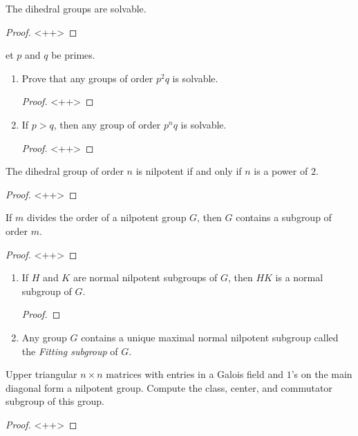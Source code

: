 \documentclass[12pt]{article}
\theoremstyle{definition}
\newenvironment{problem}[2][Problem]{\begin{trivlist}
\item[\hskip \labelsep {\bfseries #1}\hskip \labelsep {\bfseries #2.}]}{\end{trivlist}}
\begin{document}
\begin{problem}{12}
	The dihedral groups are solvable.
	\begin{proof}
		<++>
	\end{proof}
\end{problem}
\begin{problem}
	Let $p$ and $q$ be primes.
	\begin{enumerate}[label=(\alph*)]
		\item Prove that any groups of order $p^2q$ is solvable.
			\begin{proof}
				<++>
			\end{proof}
		\item If $p > q$, then any group of order $p^n q$ is solvable.
			\begin{proof}
				<++>
			\end{proof}
	\end{enumerate}
\end{problem}
\begin{problem}{14}
	The dihedral group of order $n$ is nilpotent if and only if $n$ is a power of $2$.
	\begin{proof}
		<++>
	\end{proof}
\end{problem}
\begin{problem}{15}
	If $m$ divides the order of a nilpotent group $G$, then $G$ contains a subgroup of order $m$.
	\begin{proof}
		<++>
	\end{proof}
\end{problem}
\begin{problem}{16}
	\begin{enumerate}[label=(\alph*)]
		\item If $H$ and $K$ are normal nilpotent subgroups of $G$, then $HK$ is a normal subgroup of $G$.
			\begin{proof}
				
			\end{proof}
		\item Any group $G$ contains a unique maximal normal nilpotent subgroup called the \textit{Fitting subgroup} of $G$.
	\end{enumerate}
	
\end{problem}
\begin{problem}{17}
	Upper triangular $n \times n$ matrices with entries in a Galois field and $1$'s on the main diagonal form a nilpotent group. Compute the class, center, and commutator subgroup of this group.
	\begin{proof}
		<++>
	\end{proof}
\end{problem}
\end{document}
